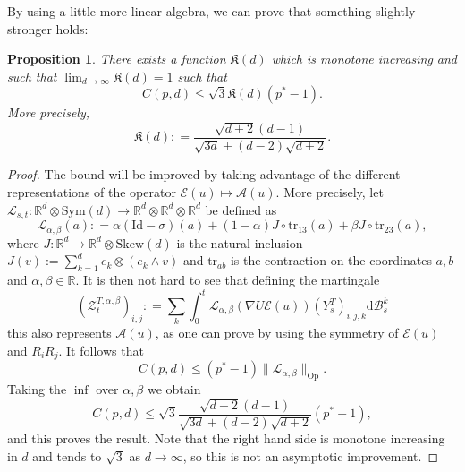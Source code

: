 \documentclass[11pt, a4paper]{amsart}
\newtheorem{proposition}{Proposition}[section]
\theoremstyle{definition}
\theoremstyle{remark}
\newcommand{\R}{\mathbb{R}}
\begin{document}
By using a little more linear algebra, we can prove that something slightly stronger holds:
\begin{proposition}
    There exists a function $\mathfrak K(d)$ which is monotone
    increasing and such that $\lim_{d\to \infty}
     \mathfrak K(d)=1$
    such that
    \begin{equation*}
        C(p,d)\le \sqrt{3}\mathfrak K(d)(p^*-1).
    \end{equation*}
    More precisely,
    \[
    \mathfrak K(d)\mathrel{:}=\frac{\sqrt{d+2}(d-1)}{\sqrt{3d}+(d-2)\sqrt{d+2}}.
    \]
\end{proposition}
\begin{proof}
The bound will be improved
        by taking advantage of the different
        representations of the operator $\mathcal E(u)\mapsto\mathcal A(u).$ More precisely, let $\mathcal L_{s,t}:\R^d\otimes \mathrm{Sym}(d)\to \R^d\otimes \R^d\otimes \R^d$
        be defined as
        \begin{equation*}
            \mathcal L_{\alpha,\beta}(a)\mathrel{:}=\alpha(\mathrm{Id}-\sigma)(a)+(1-\alpha)J\circ \mathrm{tr}_{13}(a)+\beta J\circ \mathrm{tr}_{23}(a),
        \end{equation*}
        where $J:\R^d\to \R^d\otimes \mathrm{Skew}(d)$ is the natural
        inclusion $J(v):=\sum_{k=1}^d e_k\otimes (e_k\wedge v)$
        and $\mathrm{tr}_{ab}$ is the contraction on the coordinates 
        $a,b$ and $\alpha,\beta\in \R$. It is then not hard to see that
        defining the martingale
        \begin{equation*}
            \left(\mathcal Z^{T,\alpha,\beta}_t\right)_{i,j}\mathrel{:}=\sum_k\int_0^t \mathcal L_{\alpha,\beta}(\nabla U\mathcal E(u))(Y^T_s)_{i,j,k}\mathrm{d}
            \mathcal B^k_s
        \end{equation*}
        this also represents $\mathcal A(u)$,
        as one can prove by using the symmetry of 
        $\mathcal E(u)$ and $R_iR_j$.
        It follows that
        \begin{equation*}
            C(p,d)\le (p^*-1)\|\mathcal L_{\alpha,\beta}\|_{\mathrm{Op}}.
        \end{equation*}
        Taking the $\inf$ over $\alpha,\beta$ we obtain
        \begin{equation*}
            C(p,d)\le \sqrt 3\frac{\sqrt{d+2}(d-1)}{\sqrt{3d}+(d-2)\sqrt{d+2}}(p^*-1),
        \end{equation*}
        and this proves the result. Note that the right hand side
        is monotone increasing in $d$ and tends to $\sqrt 3$
        as $d\to \infty$, so this is not an asymptotic improvement.
    \end{proof}
\end{document}
